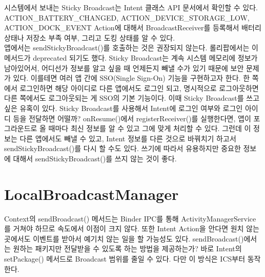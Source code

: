 시스템에서 보내는 Sticky Broadcast는 Intent 클래스 API 문서에서 확인할 수 있다. ACTION\_BATTERY\_CHANGED, ACTION\_DEVICE\_STORAGE\_LOW, ACTION\_DOCK\_EVENT Action에 대해서 BroadcastReceiver를 등록해서 배터리 상태나 저장소 부족 여부, 그리고 도킹 상태를 알 수 있다.\\

앱에서는 sendStickyBroadcast()를 호출하는 것은 권장되지 않는다. 롤리팝에서는 이 메서드가 deprecated 되기도 했다.
Sticky Broadcast는 계속 시스템 메모리에 정보가 남아있어서, 어디선가 정보를 알고 싶을 때 언제든지 빼낼 수가 있기 때문에 보안 문제가 있다.
이를테면 여러 앱 간에 SSO(Single Sign-On) 기능을 구현하고자 한다. 
한 쪽에서 로그인하면 해당 아이디로 다른 앱에서도 로그인 되고, 명시적으로 로그아웃하면 다른 쪽에서도 로그아웃되는 게 SSO의 기본 기능이다. 이때 Sticky Broadcast를 쓰고 싶은 유혹이 있다. 
Sticky Broadcast를 사용해서 Intent에 로그인 여부와 로그인 아이디 등을 전달하면 어떨까? 
onResume()에서 registerReceiver()를 실행한다면, 앱이 포그라운드로 올 때마다 최신 정보를 알 수 있고 그에 맞게 처리할 수 있다. 그런데 이 정보는 다른 앱에서도 빼낼 수 있고, Intent 정보를 다른 것으로 바꿔치기 하고서 sendStickyBroadcast()를 다시 할 수도 있다.
쓰기에 따라서 유용하지만 중요한 정보에 대해서 sendStickyBroadcast()를 쓰지 않는 것이 좋다. 

\begin{comment}
onReceive 메서드가 끝나면, BroadcastReceiver가 끝나서, 스레드로 작업 할 수는 없으므로, 
일반적으로 시간이 오래 걸리는 작업이 있다면, BroadcastReceiver에서 Service를 실행시킨다.

내부적으로 unregister를 하고 있다.
LoadedApk?
07-01 10:28:19.472: E/ActivityThread(4568): Activity com.suribada.misc.BroadcastRecieverActivity has leaked IntentReceiver \verb|com.suribada.misc.BroadcastRecieverActivity$1@b5a4f558 that was originally registered here. Are you missing a call to unregisterReceiver()?|
\end{comment}

\section{LocalBroadcastManager}
Context의 sendBroadcast() 메서드는 Binder IPC를 통해 ActivityManagerService를 거쳐야 하므로 속도에서 이점이 크지 않다. 또한 Intent Action을 안다면 원치 않는 곳에서도 이벤트를 받아서 예기치 않는 일을 할 가능성도 있다.
sendBroadcast()에서는 원하는 패키지만 전달받을 수 있도록 하는 방법을 제공하는가?
바로 Intent의 setPackage() 메서드로 Broadcast 범위를 줄일 수 있다. 
다만 이 방식은 ICS부터 동작한다.\\

